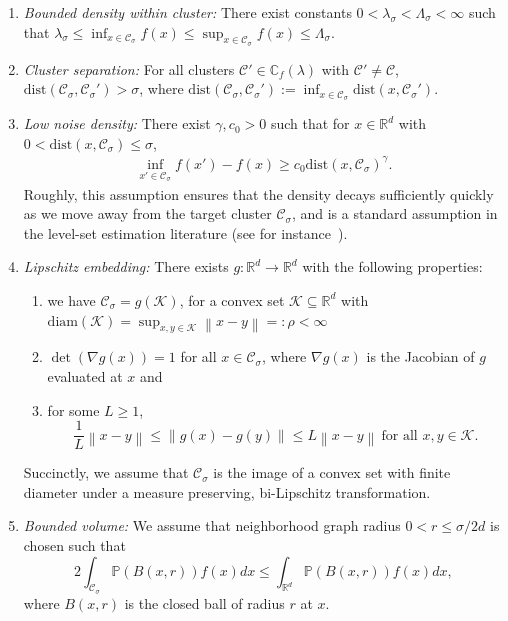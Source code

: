 \documentclass[11pt,twoside]{article}
\newcommand{\diam}{\rho}
\newcommand{\Reals}{\mathbb{R}}
\newcommand{\Rd}{\Reals^d}
\newcommand{\norm}[1]{\left\lVert#1\right\rVert}
\newcommand{\1}{\mathbf{1}}
\newcommand{\dist}{\mathrm{dist}}
\newcommand{\Pbb}{\mathbb{P}}
\newcommand{\Cbb}{\mathbb{C}}
\newcommand{\Cset}{\mathcal{C}}
\newcommand{\Csig}{\Cset_{\sigma}}
\begin{document}
\begin{enumerate}[label=(A\arabic*)]
\item
  \label{asmp: bounded_density}
  \emph{Bounded density within cluster:} There exist constants
  $0<\lambda_{\sigma}< \Lambda_{\sigma}<\infty$ such that 
  $\lambda_{\sigma} \leq \inf_{x \in \Csig} f(x) \leq \sup_{x \in \Csig} f(x)
  \leq \Lambda_{\sigma}$. 
  
\item
  \label{asmp: cluster_separation}
  \emph{Cluster separation:}
  For all clusters $\Cset' \in \Cbb_f(\lambda)$ with $\Cset' \not= \Cset$, 
  $\dist(\Csig,\Csig') > \sigma$, where $\dist(\Csig,\Csig') := \inf_{x
    \in \Csig} \dist(x,\Csig')$.  
    
\item 
  \label{asmp: low_noise_density}
  \emph{Low noise density:} There exist $\gamma,c_0 > 0$ such that for 
  $x \in \Rd$ with $0 < \dist(x, \Csig) \leq \sigma$,   
  \begin{align*}
  \inf_{x' \in \Csig} f(x') - f(x) \geq  c_0 \dist(x, \Csig)^{\gamma}. 
  \end{align*}
  Roughly, 
  this assumption ensures that the density decays sufficiently quickly as we move away from
  the target cluster $\Csig$, and is a standard assumption in the level-set estimation literature
  (see for instance~\cite{singh2009}).
  
	
\item
  \label{asmp: embedding}
  \emph{Lipschitz embedding:}
  There exists $g: \Reals^d \to \Reals^d$ with the following properties: 
  \begin{enumerate}
  \item we have $\Csig = g(\mathcal{K})$, for a convex set $\mathcal{K} \subseteq \Rd$
  with $\mathrm{diam}(\mathcal{K}) = \sup_{x,y \in \mathcal{K}}\norm{x - y} =:
  \diam < \infty$
  \item $\det(\nabla g (x)) = 1$ for all $x \in \Csig$, where
  $\nabla g(x)$ is the Jacobian of $g$ evaluated at $x$ and
  \item for some $L
  \geq 1$,   
  \begin{equation*}
    \frac{1}{L}\norm{x - y} \leq \norm{g(x) - g(y)} \leq L \norm{x - y} ~
    \text{for all $x,y \in \mathcal{K}$}. 
  \end{equation*}
  \end{enumerate}
  Succinctly, we assume that $\Csig$ is the image of a convex set with finite diameter 
  under a  measure preserving, bi-Lipschitz transformation. 

\item
  \label{asmp: bounded_volume}
  \emph{Bounded volume:}
  We assume that neighborhood graph radius $0 < r \leq \sigma/2d$ is chosen such that
  \begin{equation*}
    2 \int_{\Csig} \Pbb(B(x,r)) f(x) dx \leq \int_{\Rd} \Pbb(B(x,r)) f(x) dx,
  \end{equation*}
  where $B(x,r)$ is the closed ball of radius $r$ at $x$.
\end{enumerate}
\end{document}

